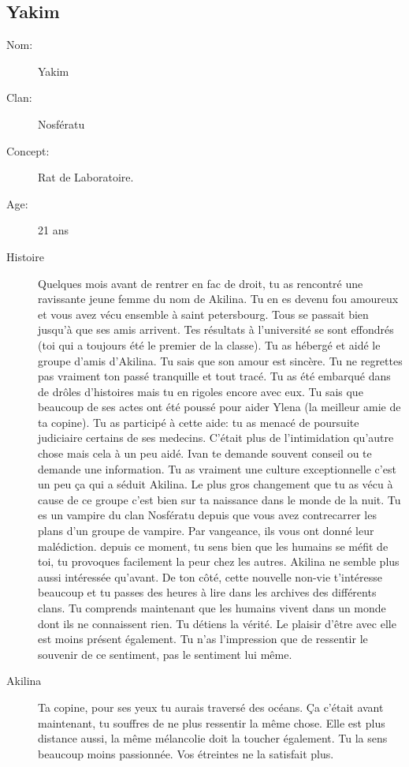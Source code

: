 \documentclass[oneside,12pt]{book}
\begin{document}
\begin{flushleft}
\section{Yakim}
\begin{description}
\item[Nom:]{Yakim}
\item[Clan:]{Nosfératu}
\item[Concept:]{Rat de Laboratoire.}
\item[Age:]{21 ans}
\item[Histoire]{
Quelques mois avant de rentrer en fac de droit, tu as rencontré une ravissante jeune femme du nom de Akilina. Tu en es devenu fou amoureux et vous avez vécu ensemble à saint petersbourg. Tous se passait bien jusqu'à que ses amis arrivent. Tes résultats à l'université se sont effondrés (toi qui a toujours été le premier de la classe). Tu as hébergé et aidé le groupe d'amis d'Akilina. Tu sais que son amour est sincère. Tu ne regrettes pas vraiment ton passé tranquille et tout tracé. Tu as été embarqué dans de drôles d'histoires mais tu en rigoles encore avec eux. Tu sais que beaucoup de ses actes ont été poussé pour aider Ylena (la meilleur amie de ta copine). Tu as participé à cette aide: tu as menacé de poursuite judiciaire certains de ses medecins. C'était plus de l'intimidation qu'autre chose mais cela à un peu aidé.
Ivan te demande souvent conseil ou te demande une information. Tu as vraiment une culture exceptionnelle c'est un peu ça qui a séduit Akilina.
Le plus gros changement que tu as vécu à cause de ce groupe c'est bien sur ta naissance dans le monde de la nuit. Tu es un vampire du clan Nosfératu depuis que vous avez contrecarrer les plans d'un groupe de vampire. Par vangeance, ils vous ont donné leur malédiction.
depuis ce moment, tu sens bien que les humains se méfit de toi, tu provoques facilement la peur chez les autres. Akilina ne semble plus aussi intéressée qu'avant. De ton côté, cette nouvelle non-vie t'intéresse beaucoup et tu passes des heures à lire dans les archives des différents clans. Tu comprends maintenant que les humains vivent dans un monde dont ils ne connaissent rien. Tu détiens la vérité. Le plaisir d'être avec elle est moins présent également. Tu n'as l'impression que de ressentir le souvenir de ce sentiment, pas le sentiment lui même.}
\end{description}
\begin{description}
\item[Akilina]{Ta copine, pour ses yeux tu aurais traversé des océans. Ça c'était avant maintenant, tu souffres de ne plus ressentir la même chose. Elle est plus distance aussi, la même mélancolie doit la toucher également. Tu la sens beaucoup moins passionnée. Vos étreintes ne la satisfait plus.}

\end{description}
\end{flushleft}
\end{document}
